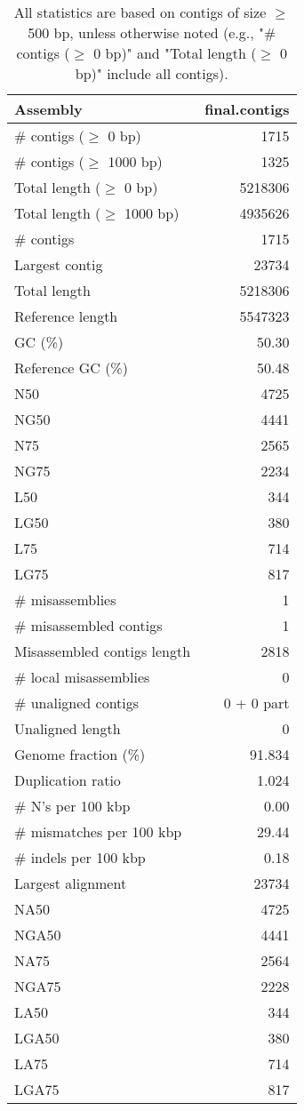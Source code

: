 \documentclass[12pt,a4paper]{article}
\begin{document}
\begin{table}[ht]
\begin{center}
\caption{All statistics are based on contigs of size $\geq$ 500 bp, unless otherwise noted (e.g., "\# contigs ($\geq$ 0 bp)" and "Total length ($\geq$ 0 bp)" include all contigs).}
\begin{tabular}{|l*{1}{|r}|}
\hline
Assembly & final.contigs \\ \hline
\# contigs ($\geq$ 0 bp) & 1715 \\ \hline
\# contigs ($\geq$ 1000 bp) & 1325 \\ \hline
Total length ($\geq$ 0 bp) & 5218306 \\ \hline
Total length ($\geq$ 1000 bp) & 4935626 \\ \hline
\# contigs & 1715 \\ \hline
Largest contig & 23734 \\ \hline
Total length & 5218306 \\ \hline
Reference length & 5547323 \\ \hline
GC (\%) & 50.30 \\ \hline
Reference GC (\%) & 50.48 \\ \hline
N50 & 4725 \\ \hline
NG50 & 4441 \\ \hline
N75 & 2565 \\ \hline
NG75 & 2234 \\ \hline
L50 & 344 \\ \hline
LG50 & 380 \\ \hline
L75 & 714 \\ \hline
LG75 & 817 \\ \hline
\# misassemblies & 1 \\ \hline
\# misassembled contigs & 1 \\ \hline
Misassembled contigs length & 2818 \\ \hline
\# local misassemblies & 0 \\ \hline
\# unaligned contigs & 0 + 0 part \\ \hline
Unaligned length & 0 \\ \hline
Genome fraction (\%) & 91.834 \\ \hline
Duplication ratio & 1.024 \\ \hline
\# N's per 100 kbp & 0.00 \\ \hline
\# mismatches per 100 kbp & 29.44 \\ \hline
\# indels per 100 kbp & 0.18 \\ \hline
Largest alignment & 23734 \\ \hline
NA50 & 4725 \\ \hline
NGA50 & 4441 \\ \hline
NA75 & 2564 \\ \hline
NGA75 & 2228 \\ \hline
LA50 & 344 \\ \hline
LGA50 & 380 \\ \hline
LA75 & 714 \\ \hline
LGA75 & 817 \\ \hline
\end{tabular}
\end{center}
\end{table}
\end{document}
